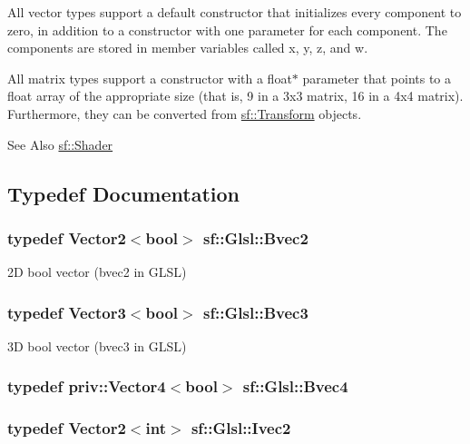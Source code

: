 All vector types support a default constructor that initializes every component to zero, in addition to a constructor with one parameter for each component. The components are stored in member variables called x, y, z, and w.

All matrix types support a constructor with a float$\ast$ parameter that points to a float array of the appropriate size (that is, 9 in a 3x3 matrix, 16 in a 4x4 matrix). Furthermore, they can be converted from \hyperlink{classsf_1_1_transform}{sf\-::\-Transform} objects.

\begin{DoxySeeAlso}{See Also}
\hyperlink{classsf_1_1_shader}{sf\-::\-Shader} 
\end{DoxySeeAlso}


\subsection{Typedef Documentation}
\hypertarget{namespacesf_1_1_glsl_a59d8cf909c3d71ebf3db057480b464da}{
\subsubsection[{Bvec2}]{\setlength{\rightskip}{0pt plus 5cm}typedef {\bf Vector2}$<${\bf bool}$>$ {\bf sf\-::\-Glsl\-::\-Bvec2}}}\label{namespacesf_1_1_glsl_a59d8cf909c3d71ebf3db057480b464da}


2\-D bool vector ({\ttfamily bvec2} in G\-L\-S\-L) 

\hypertarget{namespacesf_1_1_glsl_a4166ffc506619b4912d576e6eba2c957}{
\subsubsection[{Bvec3}]{\setlength{\rightskip}{0pt plus 5cm}typedef {\bf Vector3}$<${\bf bool}$>$ {\bf sf\-::\-Glsl\-::\-Bvec3}}}\label{namespacesf_1_1_glsl_a4166ffc506619b4912d576e6eba2c957}


3\-D bool vector ({\ttfamily bvec3} in G\-L\-S\-L) 

\hypertarget{namespacesf_1_1_glsl_a5f4f38e06558ae1baa610b119e45ea0b}{
\subsubsection[{Bvec4}]{\setlength{\rightskip}{0pt plus 5cm}typedef {\bf priv\-::\-Vector4}$<${\bf bool}$>$ {\bf sf\-::\-Glsl\-::\-Bvec4}}}\label{namespacesf_1_1_glsl_a5f4f38e06558ae1baa610b119e45ea0b}
\hypertarget{namespacesf_1_1_glsl_aab803ee70c4b7bfcd63ec09e10408fd3}{
\subsubsection[{Ivec2}]{\setlength{\rightskip}{0pt plus 5cm}typedef {\bf Vector2}$<${\bf int}$>$ {\bf sf\-::\-Glsl\-::\-Ivec2}}}\label{namespacesf_1_1_glsl_aab803ee70c4b7bfcd63ec09e10408fd3}


